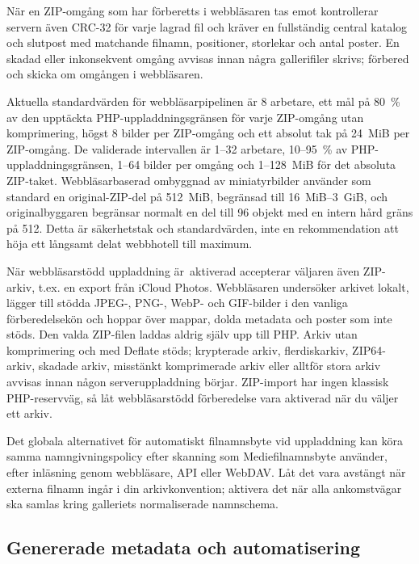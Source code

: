 \documentclass[11pt,a4paper]{article}
\begin{document}
När en ZIP-omgång som har förberetts i webbläsaren tas emot kontrollerar servern
även CRC-32 för varje lagrad fil och kräver en fullständig central katalog och
slutpost med matchande filnamn, positioner, storlekar och antal poster. En
skadad eller inkonsekvent omgång avvisas innan några gallerifiler skrivs;
förbered och skicka om omgången i webbläsaren.

Aktuella standardvärden för webbläsarpipelinen är 8 arbetare, ett mål på 80~\%
av den upptäckta PHP-uppladdningsgränsen för varje ZIP-omgång utan komprimering,
högst 8 bilder per ZIP-omgång och ett absolut tak på 24~MiB per ZIP-omgång. De
validerade intervallen är 1--32 arbetare, 10--95~\% av PHP-uppladdningsgränsen,
1--64 bilder per omgång och 1--128~MiB för det absoluta ZIP-taket.
Webbläsarbaserad ombyggnad av miniatyrbilder använder som standard en
original-ZIP-del på 512~MiB, begränsad till 16~MiB--3~GiB, och originalbyggaren
begränsar normalt en del till 96 objekt med en intern hård gräns på 512. Detta
är säkerhetstak och standardvärden, inte en rekommendation att höja ett långsamt
delat webbhotell till maximum.

När webbläsarstödd uppladdning är~aktiverad accepterar väljaren även ZIP-arkiv,
t.ex. en export från iCloud Photos. Webbläsaren undersöker arkivet lokalt,
lägger till stödda JPEG-, PNG-, WebP- och GIF-bilder i den vanliga
förberedelsekön och hoppar över mappar, dolda metadata och poster som inte
stöds. Den valda ZIP-filen laddas aldrig själv upp till PHP. Arkiv utan
komprimering och med Deflate stöds; krypterade arkiv, flerdiskarkiv,
ZIP64-arkiv, skadade arkiv, misstänkt komprimerade arkiv eller alltför stora
arkiv avvisas innan någon serveruppladdning börjar. ZIP-import har ingen
klassisk PHP-reservväg, så låt webbläsarstödd förberedelse vara aktiverad när du
väljer ett arkiv.

Det globala alternativet för automatiskt filnamnsbyte vid uppladdning kan köra
samma namngivningspolicy efter skanning som Mediefilnamnsbyte använder, efter
inläsning genom webbläsare, API eller WebDAV. Låt det vara avstängt när externa
filnamn ingår i din arkivkonvention; aktivera det när alla ankomstvägar ska
samlas kring galleriets normaliserade namnschema.
\subsection{Genererade metadata och automatisering}
\end{document}
